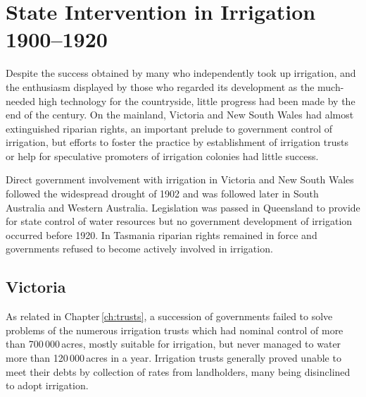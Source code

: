 
\chapter{State Intervention in Irrigation 1900--1920}

\label{ch:stateint}

\setcounter{endnote}{0}

Despite the success obtained by many who independently took up
irrigation, and the enthusiasm displayed by those who regarded its
development as the much-needed high technology for the countryside,
little progress had been made by the end of the century.  On the
mainland, Victoria and New South Wales had almost extinguished
riparian rights, an important prelude to
government control of irrigation, but efforts to foster the practice
by establishment of irrigation trusts or help for speculative
promoters of irrigation colonies had little success.

Direct government involvement with irrigation in Victoria and New
South Wales followed the widespread drought of 1902 and
was followed later in South Australia and Western Australia.
Legislation was passed in Queensland to provide for state control of
water resources but no government development of irrigation occurred
before 1920.  In Tasmania riparian rights remained in force and
governments refused to become actively involved in irrigation.

\section*{Victoria}

As related in Chapter\,\ref{ch:trusts}, a succession of governments
failed to solve problems of the numerous irrigation trusts which had
nominal control of more than 700\,000\,acres, mostly suitable for
irrigation, but never managed to water more than 120\,000\,acres in a
year.  Irrigation trusts generally proved unable to meet their debts
by collection of rates from landholders, many being disinclined to
adopt irrigation.

